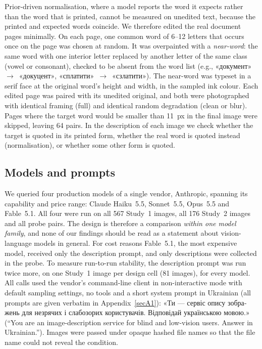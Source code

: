 \documentclass[pdflatex,sn-mathphys-num]{sn-jnl}%
\theoremstyle{thmstyleone}%
\theoremstyle{thmstyletwo}%
\theoremstyle{thmstylethree}%
\newcommand{\NImages}{567}
\newcommand{\NProbePairs}{64}
\newcommand{\RealNImages}{176}
\newcommand{\StabN}{81}
\begin{document}
Prior-driven normalisation, where a model reports the word it expects rather than the word that is printed, cannot be measured on unedited text, because the printed and expected words coincide. We therefore edited the real document pages minimally. On each page, one common word of 6--12 letters that occurs once on the page was chosen at random. It was overpainted with a \emph{near-word}: the same word with one interior letter replaced by another letter of the same class (vowel or consonant), checked to be absent from the word list (e.g., \foreignlanguage{ukrainian}{«документ»}~$\to$~\foreignlanguage{ukrainian}{«докуцент»}, \foreignlanguage{ukrainian}{«сплатити»}~$\to$~\foreignlanguage{ukrainian}{«сзлатити»}). The near-word was typeset in a serif face at the original word's height and width, in the sampled ink colour. Each edited page was paired with its unedited original, and both were photographed with identical framing (full) and identical random degradation (clean or blur). Pages where the target word would be smaller than 11~px in the final image were skipped, leaving \NProbePairs{} pairs. In the description of each image we check whether the target is quoted in its printed form, whether the real word is quoted instead (normalisation), or whether some other form is quoted.

\subsection{Models and prompts}\label{sec:models}

We queried four production models of a single vendor, Anthropic, spanning its capability and price range: Claude Haiku~5.5, Sonnet~5.5, Opus~5.5 and Fable~5.1. All four were run on all \NImages{} Study~1 images, all \RealNImages{} Study~2 images and all probe pairs. The design is therefore a comparison \emph{within one model family}, and none of our findings should be read as a statement about vision-language models in general. For cost reasons Fable~5.1, the most expensive model, received only the description prompt, and only descriptions were collected in the probe. To measure run-to-run stability, the description prompt was run twice more, on one Study~1 image per design cell (\StabN{} images), for every model. All calls used the vendor's command-line client in non-interactive mode with default sampling settings, no tools and a short system prompt in Ukrainian (all prompts are given verbatim in Appendix~\ref{secA1}): \foreignlanguage{ukrainian}{«Ти — сервіс опису зображень для незрячих і слабозорих користувачів. Відповідай українською мовою.»} (``You are an image-description service for blind and low-vision users. Answer in Ukrainian.''). Images were passed under opaque hashed file names so that the file name could not reveal the condition.
\end{document}
